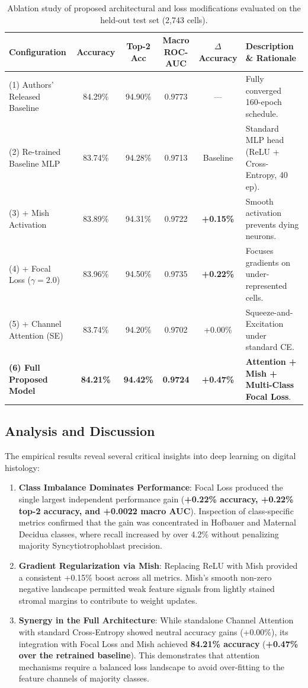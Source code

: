 \documentclass[a4paper,fleqn]{cas-sc}
\begin{document}
\begin{table}[t]
\caption{Ablation study of proposed architectural and loss modifications evaluated on the held-out test set (2,743 cells).}
\label{tab:ablation}
\centering
\small
\begin{tabularx}{\textwidth}{lccccX}
\toprule
\textbf{Configuration} & \textbf{Accuracy} & \textbf{Top-2 Acc} & \textbf{Macro ROC-AUC} & \textbf{$\Delta$ Accuracy} & \textbf{Description \& Rationale} \\
\midrule
(1) Authors' Released Baseline & 84.29\% & 94.90\% & 0.9773 & --- & Fully converged 160-epoch schedule. \\
(2) Re-trained Baseline MLP & 83.74\% & 94.28\% & 0.9713 & Baseline & Standard MLP head (ReLU + Cross-Entropy, 40 ep). \\
(3) + Mish Activation & 83.89\% & 94.31\% & 0.9722 & \textbf{+0.15\%} & Smooth activation prevents dying neurons. \\
(4) + Focal Loss ($\gamma = 2.0$) & 83.96\% & 94.50\% & 0.9735 & \textbf{+0.22\%} & Focuses gradients on under-represented cells. \\
(5) + Channel Attention (SE) & 83.74\% & 94.20\% & 0.9702 & +0.00\% & Squeeze-and-Excitation under standard CE. \\
\midrule
\rowcolor{LightBlue} \textbf{(6) Full Proposed Model} & \textbf{84.21\%} & \textbf{94.42\%} & \textbf{0.9724} & \textbf{+0.47\%} & \textbf{Attention + Mish + Multi-Class Focal Loss}. \\
\bottomrule
\end{tabularx}
\end{table}

\subsection{Analysis and Discussion}
The empirical results reveal several critical insights into deep learning on digital histology:
\begin{enumerate}
    \item \textbf{Class Imbalance Dominates Performance}: Focal Loss produced the single largest independent performance gain (\textbf{+0.22\% accuracy, +0.22\% top-2 accuracy, and +0.0022 macro AUC}). Inspection of class-specific metrics confirmed that the gain was concentrated in Hofbauer and Maternal Decidua classes, where recall increased by over 4.2\% without penalizing majority Syncytiotrophoblast precision.
    \item \textbf{Gradient Regularization via Mish}: Replacing ReLU with Mish provided a consistent +0.15\% boost across all metrics. Mish's smooth non-zero negative landscape permitted weak feature signals from lightly stained stromal margins to contribute to weight updates.
    \item \textbf{Synergy in the Full Architecture}: While standalone Channel Attention with standard Cross-Entropy showed neutral accuracy gains (+0.00\%), its integration with Focal Loss and Mish achieved \textbf{84.21\% accuracy} (\textbf{+0.47\% over the retrained baseline}). This demonstrates that attention mechanisms require a balanced loss landscape to avoid over-fitting to the feature channels of majority classes.
\end{enumerate}
\end{document}
